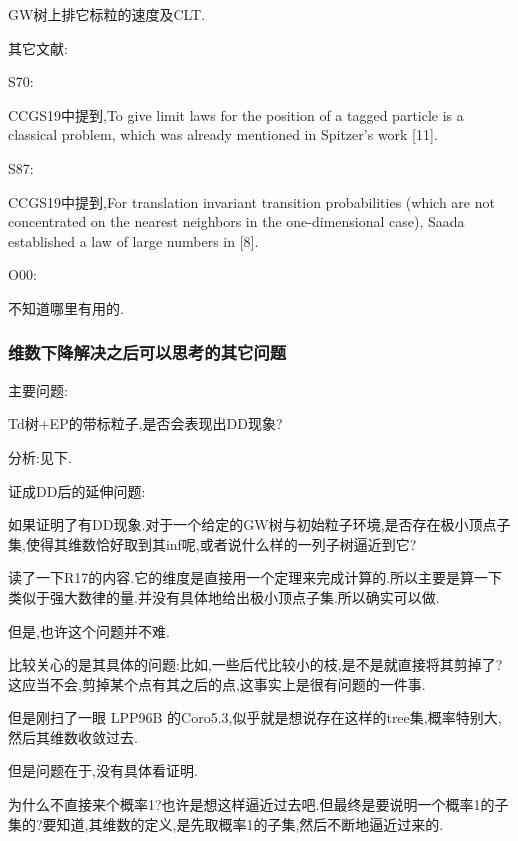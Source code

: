\documentclass[a4paper,oneside]{ctexbook}
\begin{document}
				GW树上排它标粒的速度及CLT.

			其它文献:

			S70:

				CCGS19中提到,To give limit laws for the position of a tagged particle is a classical problem, which was already mentioned in Spitzer’s work [11].

			S87:

				CCGS19中提到,For translation invariant transition probabilities (which are not concentrated on the nearest neighbors in the one-dimensional case), Saada established a law of large numbers in [8].

			O00:

				不知道哪里有用的.
			
			\subsubsection*{维数下降解决之后可以思考的其它问题}

				主要问题:

					\begin{que}

						Td树+EP的带标粒子,是否会表现出DD现象?
					
					\end{que}

					分析:见下.					

				证成DD后的延伸问题:

					\begin{que}

						如果证明了有DD现象.对于一个给定的GW树与初始粒子环境,是否存在极小顶点子集,使得其维数恰好取到其inf呢,或者说什么样的一列子树逼近到它?
					
					\end{que}

						读了一下R17的内容.它的维度是直接用一个定理来完成计算的.所以主要是算一下类似于强大数律的量.并没有具体地给出极小顶点子集.所以确实可以做.

						但是,也许这个问题并不难.

						比较关心的是其具体的问题:比如,一些后代比较小的枝,是不是就直接将其剪掉了?这应当不会,剪掉某个点有其之后的点,这事实上是很有问题的一件事.

						但是刚扫了一眼 LPP96B 的Coro5.3,似乎就是想说存在这样的tree集,概率特别大,然后其维数收敛过去.

							但是问题在于,没有具体看证明.

							为什么不直接来个概率1?也许是想这样逼近过去吧.但最终是要说明一个概率1的子集的?要知道,其维数的定义,是先取概率1的子集,然后不断地逼近过来的.	
\end{document}
